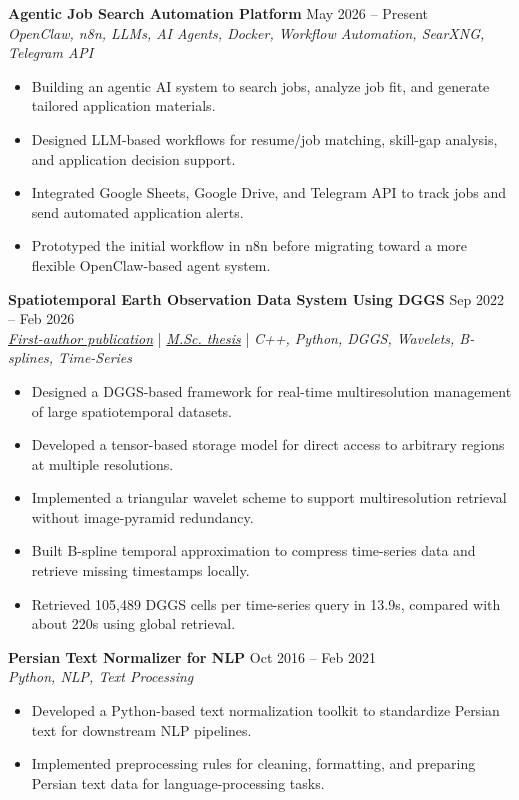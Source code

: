 \documentclass[a4paper,10pt]{article}
\begin{document}
\noindent
\textbf{Agentic Job Search Automation Platform} \hfill May 2026 -- Present \\
\textit{OpenClaw, n8n, LLMs, AI Agents, Docker, Workflow Automation, SearXNG, Telegram API}
\begin{itemize}[leftmargin=0.25in]
    \item Building an agentic AI system to search jobs, analyze job fit, and generate tailored application materials.
    \item Designed LLM-based workflows for resume/job matching, skill-gap analysis, and application decision support.
    \item Integrated Google Sheets, Google Drive, and Telegram API to track jobs and send automated application alerts.
    \item Prototyped the initial workflow in n8n before migrating toward a more flexible OpenClaw-based agent system.
\end{itemize}

\noindent
\textbf{Spatiotemporal Earth Observation Data System Using DGGS} \hfill Sep 2022 -- Feb 2026 \\
\textit{\href{https://doi.org/10.3390/rs17040570}{First-author publication}} | \textit{\href{https://ucalgary.scholaris.ca/items/114b394b-e516-4732-bd3a-45dd6160d480}{M.Sc. thesis}} | \textit{C++, Python, DGGS, Wavelets, B-splines, Time-Series}
\begin{itemize}[leftmargin=0.25in]
    \item Designed a DGGS-based framework for real-time multiresolution management of large spatiotemporal datasets.
    \item Developed a tensor-based storage model for direct access to arbitrary regions at multiple resolutions.
    \item Implemented a triangular wavelet scheme to support multiresolution retrieval without image-pyramid redundancy.
    \item Built B-spline temporal approximation to compress time-series data and retrieve missing timestamps locally.
    \item Retrieved 105,489 DGGS cells per time-series query in 13.9s, compared with about 220s using global retrieval.
\end{itemize}

\noindent
\textbf{Persian Text Normalizer for NLP} \hfill Oct 2016 -- Feb 2021 \\
\textit{Python, NLP, Text Processing}
\begin{itemize}[leftmargin=0.25in]
    \item Developed a Python-based text normalization toolkit to standardize Persian text for downstream NLP pipelines.
    \item Implemented preprocessing rules for cleaning, formatting, and preparing Persian text data for language-processing tasks.
\end{itemize}
\end{document}
